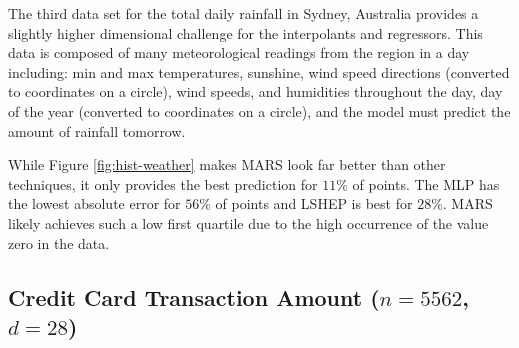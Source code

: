 \documentclass[smallextended,final]{svjour3}  %
\begin{document}
The third data set for the total daily rainfall in Sydney, Australia
\cite{williams2009rattle} provides a slightly higher dimensional
challenge for the interpolants and regressors. This data is composed
of many meteorological readings from the region in a day including:
min and max temperatures, sunshine, wind speed directions (converted
to coordinates on a circle), wind speeds, and humidities throughout
the day, day of the year (converted to coordinates on a circle), and
the model must predict the amount of rainfall tomorrow.

While Figure \ref{fig:hist-weather} makes MARS look far better than
other techniques, it only provides the best prediction for $11\%$ of
points. The MLP has the lowest absolute error for $56\%$ of points and
LSHEP is best for $28\%$. MARS likely achieves such a low first
quartile due to the high occurrence of the value zero in the data.



\subsection{Credit Card Transaction Amount ($n = 5562$, $d = 28$)}
\end{document}
